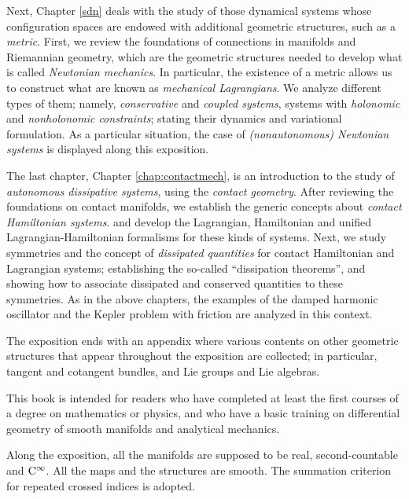 \documentclass[12pt]{report}
\def\Cinfty{{\rm C}^\infty}
\begin{document}
Next, Chapter \ref{sdn}
deals with the study of those dynamical systems whose configuration spaces are
endowed with additional geometric structures, such as a {\sl metric}.
First, we review the foundations of connections in manifolds and Riemannian geometry,
which are the geometric structures needed to develop what is called {\sl Newtonian mechanics}.
In particular, the existence of a
metric allows us to construct what are known as
 {\sl mechanical Lagrangians}. We analyze
different types of them; namely, {\sl conservative} and {\sl coupled systems},
systems with {\sl holonomic} and {\sl nonholonomic constraints};
stating their dynamics and variational formulation.
As a particular situation, the case of {\sl (nonautonomous) Newtonian systems} is
displayed along this exposition.

The last chapter, Chapter \ref{chap:contactmech}, is an introduction to the study of {\sl autonomous dissipative systems},
using the {\sl contact geometry}.
After reviewing the foundations on {contact manifolds},
we establish the generic concepts about {\sl contact Hamiltonian systems}. 
and develop the Lagrangian, Hamiltonian and unified Lagrangian-Hamiltonian formalisms for these kinds of systems.
Next, we study symmetries and the concept of {\sl dissipated quantities} for contact Hamiltonian and Lagrangian systems;
establishing the so-called ``dissipation theorems'',
and showing how to associate dissipated and conserved quantities to these symmetries.
As in the above chapters, the examples of the damped harmonic oscillator and the Kepler problem with friction
are analyzed in this context.

The exposition ends with an appendix where various contents on other
geometric structures that appear throughout the exposition are collected;
in particular, tangent and cotangent bundles, and Lie groups and Lie algebras.


This book is intended for readers who have completed at least 
the first courses of a degree on mathematics or physics, 
and who have a basic training on differential geometry of smooth manifolds and analytical mechanics.

Along the exposition, all the manifolds are supposed to be real, second-countable and $\Cinfty$. 
All the maps and the structures are smooth.  
The summation criterion for repeated crossed indices is adopted.


\end{document}
